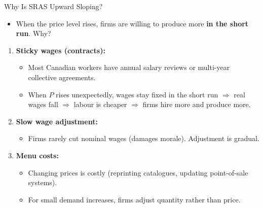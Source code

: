 \documentclass[aspectratio=169]{beamer}
\begin{document}
\begin{frame}{Why Is SRAS Upward Sloping?}
\transfade
\begin{itemize}
  \item When the price level rises, firms are willing to produce more \textbf{in the short run}. Why?
\end{itemize}
\begin{enumerate}
  \item \textbf{Sticky wages (contracts):}
  \begin{itemize}
    \item Most Canadian workers have annual salary reviews or multi-year collective agreements.
    \item When $P$ rises unexpectedly, wages stay fixed in the short run $\Rightarrow$ real wages fall $\Rightarrow$ labour is cheaper $\Rightarrow$ firms hire more and produce more.
  \end{itemize}
  \item \textbf{Slow wage adjustment:}
  \begin{itemize}
    \item Firms rarely cut nominal wages (damages morale). Adjustment is gradual.
  \end{itemize}
  \item \textbf{Menu costs:}
  \begin{itemize}
    \item Changing prices is costly (reprinting catalogues, updating point-of-sale systems).
    \item For small demand increases, firms adjust quantity rather than price.
  \end{itemize}
\end{enumerate}
\end{frame}
\end{document}
